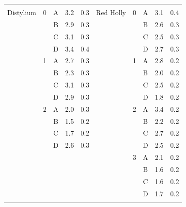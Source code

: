\documentclass[12pt]{article}
\begin{document}
\begin{table}
\begin{tabular}{cccccccccc}
					&		&		& 		&					&				&		&		& 		&		\\
Distylium				&	0	&	A	& 	3.2	&	0.3				&Red Holly			&	0	&	A	& 	3.1	&	0.4	\\
					&		&	B	& 	2.9	&	0.3				&				&		&	B	& 	2.6	&	0.3	\\
					&		&	C	& 	3.1	&	0.3				&				&		&	C	& 	2.5	&	0.3	\\
					&		&	D	& 	3.4	&	0.4				&				&		&	D	& 	2.7	&	0.3	\\
					&	1	&	A	& 	2.7	&	0.3				&				&	1	&	A	& 	2.8	&	0.2	\\
					&		&	B	& 	2.3	&	0.3				&				&		&	B	& 	2.0	&	0.2	\\
					&		&	C	& 	3.1	&	0.3				&				&		&	C	& 	2.5	&	0.2	\\
					&		&	D	& 	2.9	&	0.3				&				&		&	D	& 	1.8	&	0.2	\\
					&	2	&	A	& 	2.0	&	0.3				&				&	2	&	A	& 	3.4	&	0.2	\\
					&		&	B	& 	1.5	&	0.2				&				&		&	B	& 	2.2	&	0.2	\\
					&		&	C	& 	1.7	&	0.2				&				&		&	C	& 	2.7	&	0.2	\\
					&		&	D	& 	2.6	&	0.3				&				&		&	D	& 	2.5	&	0.2	\\
					&		&		& 		&					&				&	3	&	A	& 	2.1	&	0.2	\\
					&		&		& 		&					&				&		&	B	& 	1.6	&	0.2	\\
					&		&		& 		&					&				&		&	C	& 	1.6	&	0.2	\\
					&		&		& 		&					&				&		&	D	& 	1.7	&	0.2	\\
\\[0.05cm]
\hline														

\end{tabular}
\end{table}
\end{document}
